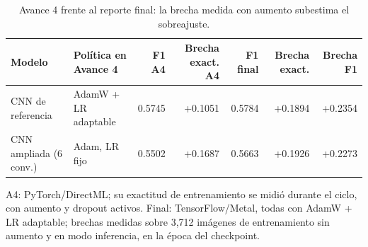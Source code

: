 \begin{table}[htbp]
\centering
\caption{Avance 4 frente al reporte final: la brecha medida con aumento subestima el sobreajuste.}
\label{tab:avance4}
\small
\begin{tabular}{llrrrrr}
\toprule
Modelo & Política en Avance 4 & F1 A4 & Brecha exact. A4 & F1 final & Brecha exact. & Brecha F1 \\
\midrule
CNN de referencia & AdamW + LR adaptable & 0.5745 & +0.1051 & 0.5784 & +0.1894 & +0.2354 \\
CNN ampliada (6 conv.) & Adam, LR fijo & 0.5502 & +0.1687 & 0.5663 & +0.1926 & +0.2273 \\
\bottomrule
\end{tabular}
\par\smallskip
\parbox{0.95\textwidth}{\footnotesize A4: PyTorch/DirectML; su exactitud de entrenamiento se midió durante el ciclo, con aumento y dropout activos. Final: TensorFlow/Metal, todas con AdamW + LR adaptable; brechas medidas sobre 3,712 imágenes de entrenamiento sin aumento y en modo inferencia, en la época del checkpoint.}
\end{table}
